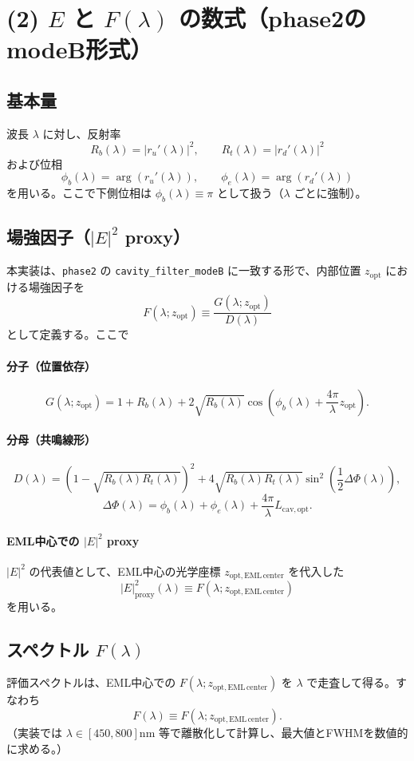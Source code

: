 \section{(2) \(E\) と \(F(\lambda)\) の数式（phase2のmodeB形式）}

\subsection{基本量}
波長 \(\lambda\) に対し、反射率
\[
R_b(\lambda)=|r_u'(\lambda)|^2,\qquad R_t(\lambda)=|r_d'(\lambda)|^2
\]
および位相
\[
\phi_b(\lambda)=\arg(r_u'(\lambda)),\qquad \phi_e(\lambda)=\arg(r_d'(\lambda))
\]
を用いる。ここで下側位相は \(\phi_b(\lambda)\equiv \pi\) として扱う（\(\lambda\) ごとに強制）。

\subsection{場強因子（\(|E|^2\) proxy）}
本実装は、\texttt{phase2} の \texttt{cavity\_filter\_modeB} に一致する形で、内部位置 \(z_{\mathrm{opt}}\) における場強因子を
\[
F(\lambda; z_{\mathrm{opt}})\equiv \frac{G(\lambda; z_{\mathrm{opt}})}{D(\lambda)}
\]
として定義する。ここで

\paragraph{分子（位置依存）}
\[
G(\lambda; z_{\mathrm{opt}})=
1+R_b(\lambda)+2\sqrt{R_b(\lambda)}\cos\!\left(\phi_b(\lambda)+\frac{4\pi}{\lambda}z_{\mathrm{opt}}\right).
\]

\paragraph{分母（共鳴線形）}
\[
D(\lambda)=
\left(1-\sqrt{R_b(\lambda)R_t(\lambda)}\right)^2+
4\sqrt{R_b(\lambda)R_t(\lambda)}
\sin^2\!\left(\frac{1}{2}\Delta\Phi(\lambda)\right),
\]
\[
\Delta\Phi(\lambda)=\phi_b(\lambda)+\phi_e(\lambda)+\frac{4\pi}{\lambda}L_{\mathrm{cav,opt}}.
\]

\paragraph{EML中心での \(|E|^2\) proxy}
\(|E|^2\) の代表値として、EML中心の光学座標 \(z_{\mathrm{opt,EML\,center}}\) を代入した
\[
|E|^2_{\mathrm{proxy}}(\lambda)\equiv F(\lambda; z_{\mathrm{opt,EML\,center}})
\]
を用いる。

\subsection{スペクトル \(F(\lambda)\)}
評価スペクトルは、EML中心での \(F(\lambda; z_{\mathrm{opt,EML\,center}})\) を \(\lambda\) で走査して得る。すなわち
\[
F(\lambda)\equiv F(\lambda; z_{\mathrm{opt,EML\,center}}).
\]
（実装では \(\lambda\in[450,800]\mathrm{nm}\) 等で離散化して計算し、最大値とFWHMを数値的に求める。）


